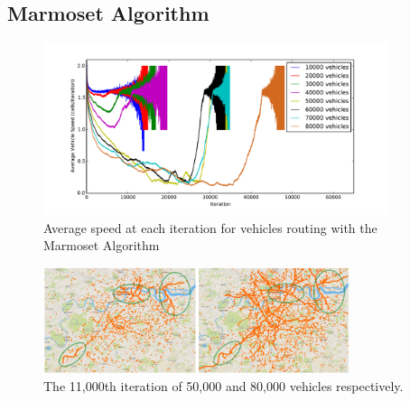 \documentclass[ %
                    author={Alexander Hill},
                supervisor={Dr. Benjamin Sach},
                    degree={MEng},
                     title={MARMOSET},
                  subtitle={Multi-Agent Route Management using Online Simulation for Efficient Transportation},
                      type={research},
                      year={2016} ]{dissertation}
\begin{document}
\subsection{Marmoset Algorithm}\label{sec:marmoset-eval}

\begin{figure}[p]
    \centering
    \includegraphics[width=0.9\textwidth]{sdv-speed}
    \caption{Average speed at each iteration for vehicles routing with the Marmoset Algorithm}\label{fig:sdv-speed}
\end{figure}

\begin{figure}[p]
    \centering
    \includegraphics[width=0.8\textwidth]{i11k-sdv-comparison}
    \caption{The 11,000th iteration of 50,000 and 80,000 vehicles respectively.}\label{fig:i11k-congestion}
\end{figure}
\end{document}
